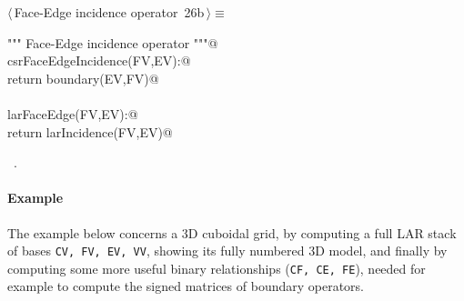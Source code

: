 \documentclass[11pt,oneside]{article}    %
\begin{document}
\begin{flushleft} \small \label{scrap42}
\protect{}$\langle\,$Face-Edge incidence operator\nobreak\ {\footnotesize 26b}$\,\rangle\equiv$
\vspace{-1ex}
\begin{list}{}{} \item
\mbox{}\verb@""" Face-Edge incidence operator """@\\
\mbox{}\verb@def csrFaceEdgeIncidence(FV,EV):@\\
\mbox{}\verb@    return boundary(EV,FV)@\\
\mbox{}\verb@@\\
\mbox{}\verb@def larFaceEdge(FV,EV):@\\
\mbox{}\verb@    return larIncidence(FV,EV)@\\
\mbox{}\verb@@{\NWsep}
\end{list}
\vspace{-1ex}
\footnotesize\addtolength{\baselineskip}{-1ex}
\begin{list}{}{\setlength{\itemsep}{-\parsep}\setlength{\itemindent}{-\leftmargin}}
\item \NWtxtMacroRefIn\ .
\end{list}
\end{flushleft}


\paragraph{Example}
The example below concerns a 3D cuboidal grid, by computing a full LAR stack of bases
\texttt{CV, FV, EV, VV}, showing its fully numbered 3D model, and finally by computing
some more useful binary relationships (\texttt{CF, CE, FE}), needed for example to compute the signed matrices of boundary operators.
\end{document}
